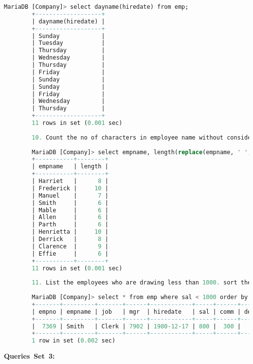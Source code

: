 \documentclass{article}
\begin{document}
\begin{lstlisting}[language=SQL]
		MariaDB [Company]> select dayname(hiredate) from emp; 
		+-------------------+ 
		| dayname(hiredate) | 
		+-------------------+ 
		| Sunday            | 
		| Tuesday           | 
		| Thursday          | 
		| Wednesday         | 
		| Thursday          | 
		| Friday            | 
		| Sunday            | 
		| Sunday            | 
		| Friday            | 
		| Wednesday         | 
		| Thursday          | 
		+-------------------+ 
		11 rows in set (0.001 sec) 
		
		10. Count the no of characters in employee name without considering spaces for each name. 
		
		MariaDB [Company]> select empname, length(replace(empname, ' ', '')) + 1 as length from emp; 
		+-----------+--------+ 
		| empname   | length | 
		+-----------+--------+ 
		| Harriet   |      8 | 
		| Frederick |     10 | 
		| Manuel    |      7 | 
		| Smith     |      6 | 
		| Mable     |      6 | 
		| Allen     |      6 | 
		| Parth     |      6 | 
		| Henrietta |     10 | 
		| Derrick   |      8 | 
		| Clarence  |      9 | 
		| Effie     |      6 | 
		+-----------+--------+ 
		11 rows in set (0.001 sec) 
		
		11. List the employees who are drawing less than 1000. sort the output by salary. 
		
		MariaDB [Company]> select * from emp where sal < 1000 order by sal; 
		+-------+---------+-------+------+------------+-----+------+--------+ 
		| empno | empname | job   | mgr  | hiredate   | sal | comm | deptno | 
		+-------+---------+-------+------+------------+-----+------+--------+ 
		|  7369 | Smith   | Clerk | 7902 | 1980-12-17 | 800 |  300 |     20 | 
		+-------+---------+-------+------+------------+-----+------+--------+ 
		1 row in set (0.002 sec) 
	\end{lstlisting} 
	\textbf{Queries Set 3:} 
\end{document}
